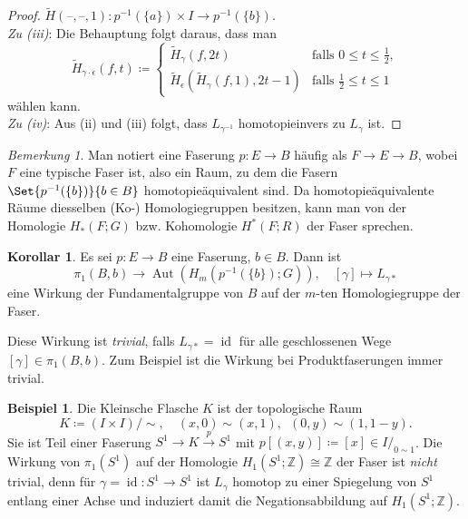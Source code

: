 \documentclass[11pt, a4paper, german]{article}
\theoremstyle{definition}
\newtheorem{bsp}[lem]{Beispiel}
\newtheorem{kor}[lem]{Korollar}
\theoremstyle{remark}
\newtheorem*{bem}{Bemerkung}
\newcommand{\Z}{\mathbb{Z}} %
\DeclareMathOperator{\id}{id} %
\newcommand{\blank}{\text{--}} %
\DeclareMathOperator{\Aut}{Aut} %
\newcommand{\I}{I} %
\newcommand{\fall}[1]{\emph{#1}:\enspace}
\begin{document}
\begin{proof}
  $\tilde{H}(\blank, \blank, 1) : p^{-1}(\{a\}) \times \I \to p^{-1}(\{b\})$. \\[2pt]
  \fall{Zu (iii)} Die Behauptung folgt daraus, dass man
  \[
    \tilde{H}_{\gamma \cdot \epsilon}(f, t) \coloneqq \begin{cases}
      \tilde{H}_\gamma(f, 2t) & \text{falls } 0 \leq t \leq \tfrac{1}{2}, \\
      \tilde{H}_\epsilon(\tilde{H}_\gamma(f, 1), 2t - 1) & \text{falls } \tfrac{1}{2} \leq t \leq 1
    \end{cases}
  \]
  wählen kann. \\[2pt]
  \fall{Zu (iv)} Aus (ii) und (iii) folgt, dass $L_{\gamma^{-1}}$ homotopieinvers zu $L_\gamma$ ist.
\end{proof}

\begin{bem}
  Man notiert eine Faserung $p : E \to B$ häufig als $F \to E \to B$, wobei $F$ eine typische Faser ist, also ein Raum, zu dem die Fasern $\Set{p^{-1}(\{b\})}{b \in B}$ homotopieäquivalent sind.
  Da homotopieäquivalente Räume diesselben (Ko-) Homologiegruppen besitzen, kann man von der Homologie $H_*(F; G)$ bzw. Kohomologie $H^*(F; R)$ der Faser sprechen.
\end{bem}

\begin{kor}
  Es sei $p : E \to B$ eine Faserung, $b \in B$.
  Dann ist
  \[
    \pi_1(B, b) \to \Aut(H_m(p^{-1}(\{b\}); G)), \quad
    [\gamma] \mapsto L_{\gamma*}
  \]
  eine Wirkung der Fundamentalgruppe von $B$ auf der $m$-ten Homologiegruppe der Faser.
\end{kor}

Diese Wirkung ist \emph{trivial}, falls $L_{\gamma*} = \id$ für alle geschlossenen Wege $[\gamma] \in \pi_1(B, b)$.
Zum Beispiel ist die Wirkung bei Produktfaserungen immer trivial.

\begin{bsp}
  Die Kleinsche Flasche $K$ ist der topologische Raum
  \[
    K \coloneqq (\I \times \I)/{\sim}, \quad
    (x, 0) \sim (x, 1), \enspace
    (0, y) \sim (1, 1-y).
  \]
  Sie ist Teil einer Faserung $S^1 \to K \xrightarrow{p} S^1$ mit $p[(x,y)] \coloneqq [x] \in I/_{0 \sim 1}$.
  Die Wirkung von $\pi_1(S^1)$ auf der Homologie $H_1(S^1; \Z) \cong \Z$ der Faser ist \emph{nicht} trivial, denn für $\gamma = \id : S^1 \to S^1$ ist $L_\gamma$ homotop zu einer Spiegelung von $S^1$ entlang einer Achse und induziert damit die Negationsabbildung auf $H_1(S^1; \Z)$.
\end{bsp}
\end{document}
